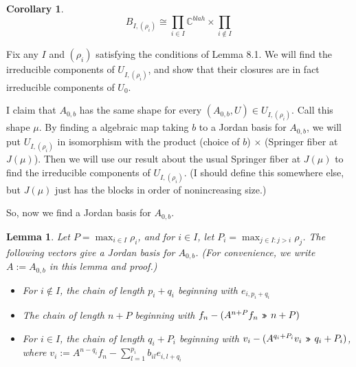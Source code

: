 \documentclass[12pt,psamsfonts]{article}
\newcommand{\leftshift}{\,\texttt{<<}\,}
\newcommand{\rightshift}{\mathbin{\rotatebox[origin=c]{180}{\leftshift}}}
\newtheorem{lemma}[theorem]{Lemma}
\newtheorem{corollary}[theorem]{Corollary}
\begin{document}
\begin{corollary}
    \[B_{I, (\rho_i)} \cong \prod_{i \in I} \mathbb{C}^{blah} \times \prod_{i \notin I}\]
\end{corollary}
Fix any \(I\) and \((\rho_i)\) satisfying the conditions of Lemma 8.1.
We will find the irreducible components of \(U_{I, (\rho_i)}\), and show that their closures are in fact irreducible components of \(U_0\).
\par I claim that \(A_{0,b}\) has the same shape for every \((A_{0, b}, U) \in U_{I, (\rho_i)}\).
Call this shape \(\mu\).
By finding a algebraic map taking \(b\) to a Jordan basis for \(A_{0,b}\), we will put \(U_{I, (\rho_i)}\) in isomorphism with the product (choice of \(b\)) \(\times\) (Springer fiber at \(J(\mu)\)).
Then we will use our result about the usual Springer fiber at \(J(\mu)\) to find the irreducible components of \(U_{I, (\rho_i)}\).
(I should define this somewhere else, but \(J(\mu)\) just has the blocks in order of nonincreasing size.)
\par So, now we find a Jordan basis for \(A_{0, b}\).
\begin{lemma}
    Let \(P = \max_{i \in I} \rho_i\), and for \(i \in I\), let \(P_i = \max_{j \in I : j > i} \rho_j\).
    The following vectors give a Jordan basis for \(A_{0,b}\).
    (For convenience, we write \(A := A_{0,b}\) in this lemma and proof.)
    \begin{itemize}
        \item For \(i \notin I\), the chain of length \(p_i + q_i\) beginning with \(e_{i, p_i + q_i}\)
        \item The chain of length \(n + P\) beginning with \(f_n - (A^{n + P}f_n \rightshift n + P)\)
        \item For \(i \in I\), the chain of length \(q_i + P_i\) beginning with \(v_i - (A^{q_i + P_i} v_i \rightshift q_i + P_i)\), where \(v_i := A^{n - q_i} f_n - \sum_{l = 1}^{p_i} b_{il} e_{i,l + q_i}\)
    \end{itemize}
\end{lemma}
\end{document}

